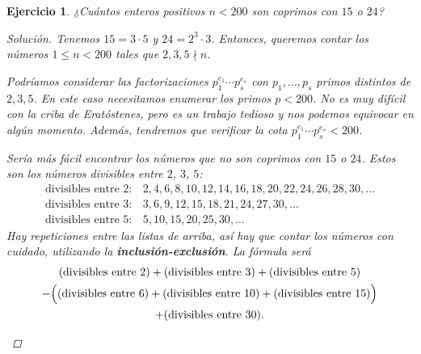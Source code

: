 \documentclass{article}
\theoremstyle{plain}
\newtheorem{ejercicio}{Ejercicio}
\newenvironment{solucion}{\begin{proof}[Solución]}{\end{proof}}
\begin{document}
\begin{ejercicio}
¿Cuántos enteros positivos $n < 200$ son coprimos con $15$ o $24$?

\ifdefined\solutions
\begin{solucion}
    Tenemos $15 = 3\cdot 5$ y $24 = 2^3\cdot 3$. Entonces, queremos contar los
    números $1 \le n < 200$ tales que $2, 3, 5 \nmid n$.
    
    Podríamos considerar las factorizaciones $p_1^{e_1}\cdots p_s^{e_s}$ con
    $p_1, \ldots, p_s$ primos distintos de $2, 3, 5$. En este caso necesitamos
    enumerar los primos $p < 200$. No es muy difícil con la criba de Eratóstenes,
    pero es un trabajo tedioso y nos podemos equivocar en algún momento.
    Además, tendremos que verificar la cota $p_1^{e_1}\cdots p_s^{e_s} < 200$.

    Sería más fácil encontrar los números que \emph{no son} coprimos con $15$ o $24$.
    Estos son los números divisibles entre $2$, $3$, $5$:
    \begin{align*}
        \text{divisibles entre }2\colon & 2, 4, 6, 8, 10, 12, 14, 16, 18, 20, 22, 24, 26, 28, 30, \ldots \\
        \text{divisibles entre }3\colon & 3, 6, 9, 12, 15, 18, 21, 24, 27, 30, \ldots \\
        \text{divisibles entre }5\colon & 5, 10, 15, 20, 25, 30, \ldots
    \end{align*}
    Hay repeticiones entre las listas de arriba, así hay que contar los números
    con cuidado, utilizando la \textbf{inclusión-exclusión}. La fórmula será
    \begin{gather*}
        (\text{divisibles entre }2) + (\text{divisibles entre }3) + (\text{divisibles entre }5)\\
        -\Bigl((\text{divisibles entre }6) + (\text{divisibles entre }10) + (\text{divisibles entre }15)\Bigr) \\
        + (\text{divisibles entre }30).
    \end{gather*}

    \begin{center}
\end{center}
\end{solucion}
\end{ejercicio}
\end{document}
